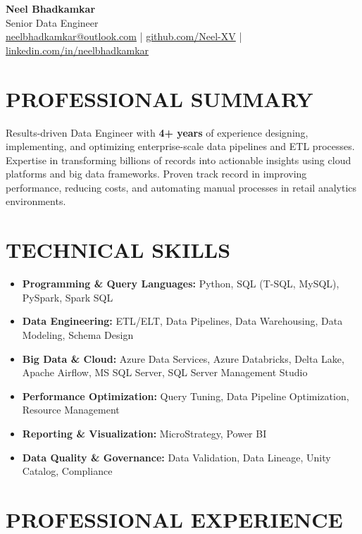 \documentclass[10pt,letterpaper]{article}
\begin{document}
\begin{center}
    {\Large\bfseries Neel Bhadkamkar} \\[2pt]
    {\normalsize Senior Data Engineer} \\[4pt]
    \href{mailto:neelbhadkamkar@outlook.com}{neelbhadkamkar@outlook.com} | 
    \href{https://github.com/Neel-XV}{github.com/Neel-XV} | 
    \href{https://linkedin.com/in/neelbhadkamkar}{linkedin.com/in/neelbhadkamkar}
\end{center}

\section{PROFESSIONAL SUMMARY}
\noindent Results-driven Data Engineer with \textbf{4+ years} of experience designing, implementing, and optimizing enterprise-scale data pipelines and ETL processes. Expertise in transforming billions of records into actionable insights using cloud platforms and big data frameworks. Proven track record in improving performance, reducing costs, and automating manual processes in retail analytics environments.

\section{TECHNICAL SKILLS}
\begin{itemize}[leftmargin=*,nosep,itemsep=2pt]
    \item \textbf{Programming \& Query Languages:} Python, SQL (T-SQL, MySQL), PySpark, Spark SQL
    \item \textbf{Data Engineering:} ETL/ELT, Data Pipelines, Data Warehousing, Data Modeling, Schema Design
    \item \textbf{Big Data \& Cloud:} Azure Data Services, Azure Databricks, Delta Lake, Apache Airflow, MS SQL Server, SQL Server Management Studio
    \item \textbf{Performance Optimization:} Query Tuning, Data Pipeline Optimization, Resource Management
    \item \textbf{Reporting \& Visualization:} MicroStrategy, Power BI
    \item \textbf{Data Quality \& Governance:} Data Validation, Data Lineage, Unity Catalog, Compliance
\end{itemize}

\section{PROFESSIONAL EXPERIENCE}
\end{document}
